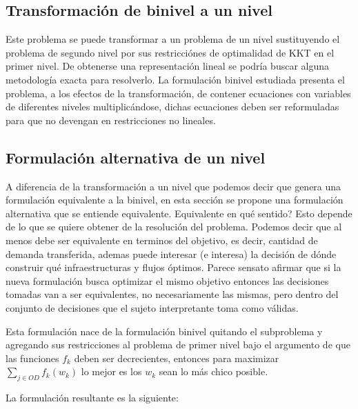 \documentclass{article}
\begin{document}
  \subsection*{Transformación de binivel a un nivel}

  Este problema se puede transformar a un problema de un nivel sustituyendo el problema de segundo nivel por sus restricciónes de optimalidad de KKT en el primer nivel. De obtenerse una representación lineal se podría buscar alguna metodología exacta para resolverlo. La formulación binivel estudiada presenta el problema, a los efectos de la transformación, de contener ecuaciones con variables de diferentes niveles multiplicándose, dichas ecuaciones deben ser reformuladas para que no devengan en restricciones no lineales.

  \subsection*{Formulación alternativa de un nivel}
  \label{altOneLevelFormulation}

  A diferencia de la transformación a un nivel que podemos decir que genera una formulación equivalente a la binivel, en esta sección se propone una formulación alternativa que se entiende equivalente. Equivalente en qué sentido? Esto depende de lo que se quiere obtener de la resolución del problema. Podemos decir que al menos debe ser equivalente en terminos del objetivo, es decir, cantidad de demanda transferida, ademas puede interesar (e interesa) la decisión de dónde construir qué infraestructuras y flujos óptimos. Parece sensato afirmar que si la nueva formulación busca optimizar el mismo objetivo entonces las decisiones tomadas van a ser equivalentes, no necesariamente las mismas, pero dentro del conjunto de decisiones que el sujeto interpretante toma como válidas.

  Esta formulación nace de la formulación binivel quitando el subproblema y agregando sus restricciones al problema de primer nivel bajo el argumento de que las funciones $f_k$ deben ser decrecientes, entonces para maximizar $\sum_{j \in OD}f_k(w_k)$ lo mejor es los $w_k$ sean lo más chico posible.

  La formulación resultante es la siguiente:
\end{document}
